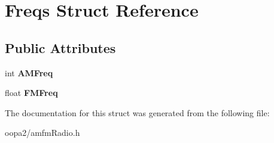 \hypertarget{struct_freqs}{\section{Freqs Struct Reference}
\label{struct_freqs}
}
\subsection*{Public Attributes}
\begin{DoxyCompactItemize}
\item 
\hypertarget{struct_freqs_a184515ee6cb563ee8afe0950d05c4a7d}{int {\bfseries A\-M\-Freq}}\label{struct_freqs_a184515ee6cb563ee8afe0950d05c4a7d}

\item 
\hypertarget{struct_freqs_a9e266ffbe3caa25b1ccf11f0ee75bd3c}{float {\bfseries F\-M\-Freq}}\label{struct_freqs_a9e266ffbe3caa25b1ccf11f0ee75bd3c}

\end{DoxyCompactItemize}


The documentation for this struct was generated from the following file\-:\begin{DoxyCompactItemize}
\item 
oopa2/amfm\-Radio.\-h\end{DoxyCompactItemize}
